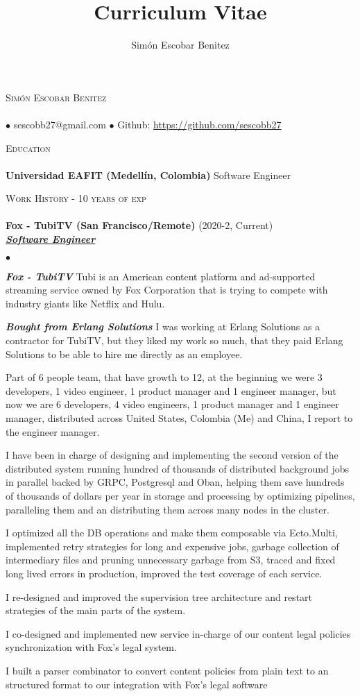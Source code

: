 \documentclass[a4paper]{article}
\title{Curriculum Vitae}
\author{Sim\'on Escobar Benitez}
\newcommand{\lineunder}{\vspace*{-8pt} \\ \hspace*{-18pt} \hrulefill \\}
\newcommand{\header}[1]{{\hspace*{-15pt}\vspace*{6pt}
  \textsc{#1}} \vspace*{-6pt} \lineunder}
\newcommand{\employer}[3]{{
  \textbf{#1} (#2)\\ \underline{\textbf{\emph{#3}}}\\ }}
\newcommand{\contact}[2]{
  \vspace*{-8pt}
  \begin{center}
  {\LARGE \scshape {#1}} \lineunder #2
  \end{center}
  \vspace*{-8pt} }
\newenvironment{achievements}{\begin{list}{$\bullet$}{\topsep 0pt \itemsep
  -2pt}}{\vspace*{4pt}\end{list}}
\newcommand{\schoolwithcourses}[2]{
  \textbf{#1} #2
  \vspace*{5pt} }
\newcommand{\emphasys}[1]{\textbf{\emph{#1}}}
\begin{document}
  \small
  \smallskip
  \vspace*{-44pt}
  \contact{Sim\'on Escobar Benitez} { $\bullet$ sescobb27@gmail.com $\bullet$ Github: \url{https://github.com/sescobb27} }
  \header{Education}
  \schoolwithcourses{Universidad EAFIT (Medell\'in, Colombia)}{Software Engineer}

  \header{Work History - 10 years of exp}

  \employer{ Fox - TubiTV (San Francisco/Remote)}{2020-2, Current}{Software Engineer}
  \begin{achievements}
  \item \emphasys{Fox - TubiTV} Tubi is an American content platform and ad-supported streaming service owned by Fox Corporation that is trying to compete with industry giants like Netflix and Hulu.
  \item \emphasys{Bought from Erlang Solutions} I was working at Erlang Solutions as a contractor for TubiTV, but they liked my work so much, that they paid Erlang Solutions to be able to hire me directly as an employee.
  \item Part of 6 people team, that have growth to 12, at the beginning we were 3 developers, 1 video engineer, 1 product manager and 1 engineer manager, but now we are 6 developers, 4 video engineers, 1 product manager and 1 engineer manager, distributed across United States, Colombia (Me) and China, I report to the engineer manager.
  \item I have been in charge of designing and implementing the second version of the distributed system running hundred of thousands of distributed background jobs in parallel backed by GRPC, Postgresql and Oban, helping them save hundreds of thousands of dollars per year in storage and processing by optimizing pipelines, paralleling them and an distributing them across many nodes in the cluster.
  \item I optimized all the DB operations and make them composable via Ecto.Multi, implemented retry strategies for long and expensive jobs, garbage collection of intermediary files and pruning unnecessary garbage from S3, traced and fixed long lived errors in production, improved the test coverage of each service.
  \item I re-designed and improved the supervision tree architecture and restart strategies of the main parts of the system.
  \item I co-designed and implemented new service in-charge of our content legal policies synchronization with Fox's legal system.
  \item I built a parser combinator to convert content policies from plain text to an structured format to our integration with Fox's legal software

\end{achievements}
\end{document}
